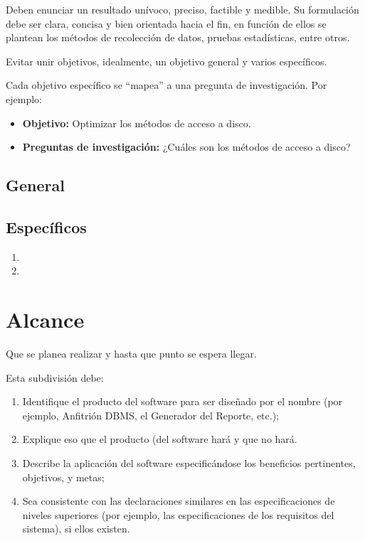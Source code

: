 \documentclass[letter,12pt]{report}
\newcommand\naranjo[1]{\textcolor[rgb]{1.00,0.36,0.06}{\textbf{#1}}}
\begin{document}
Deben enunciar un resultado unívoco, preciso, factible y medible. Su formulación debe ser clara, concisa y bien orientada hacia el fin, en función de ellos se plantean los métodos de recolección de datos, pruebas estadísticas, entre otros.

Evitar unir objetivos, idealmente, un objetivo general y varios específicos.

Cada objetivo específico se ``mapea'' a una pregunta de investigación.
Por ejemplo:
  \begin{itemize}
  \item \textbf{\naranjo{Objetivo:}} Optimizar los métodos de acceso a disco.
  \item \textbf{\naranjo{Preguntas de investigación:}} ¿Cuáles son los métodos de acceso a disco?
\end{itemize}

\subsection{General}
\blindtext %

\subsection{Específicos}
\begin{enumerate}\justifying
  \item 
  \blindtext %

  \item 
  \blindtext %


\end{enumerate}

\section{Alcance}
Que se planea realizar y hasta que punto se espera llegar.

Esta subdivisión debe:
\begin{enumerate}\justifying
  \item Identifique el producto del software para ser diseñado por el nombre (por ejemplo, Anfitrión DBMS, el Generador del Reporte, etc.);
  \item Explique eso que el producto (del software hará y que no hará.
  \item Describe la aplicación del software especificándose los beneficios pertinentes, objetivos, y metas;
  \item Sea consistente con las declaraciones similares en las especificaciones de niveles superiores (por ejemplo, las especificaciones de los requisitos del sistema), si ellos existen.
\end{enumerate}
\end{document}
